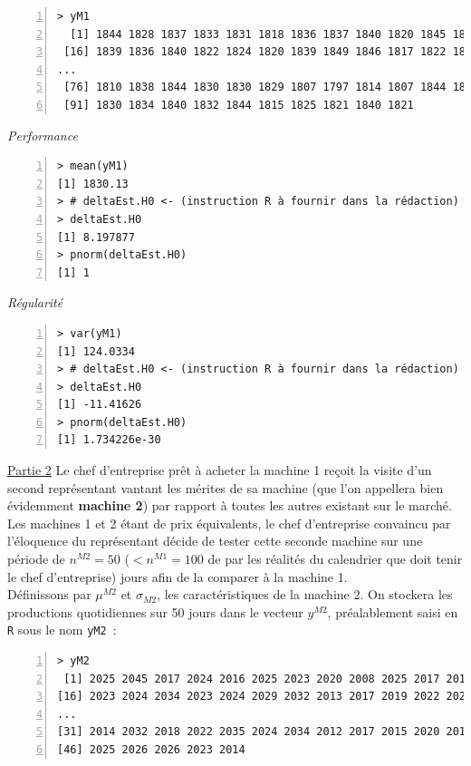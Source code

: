 \documentclass[10pt]{report}
\begin{document}
\begin{exercice}
\IndicR
\begin{Verbatim}[frame=leftline,fontfamily=tt,fontshape=n,numbers=left]
> yM1
  [1] 1844 1828 1837 1833 1831 1818 1836 1837 1840 1820 1845 1815 1831 1839 1824
 [16] 1839 1836 1840 1822 1824 1820 1839 1849 1846 1817 1822 1832 1846 1832 1834
...
 [76] 1810 1838 1844 1830 1830 1829 1807 1797 1814 1807 1844 1834 1827 1841 1830
 [91] 1830 1834 1840 1832 1844 1815 1825 1821 1840 1821
\end{Verbatim}

\noindent \textit{Performance}
\begin{Verbatim}[frame=leftline,fontfamily=tt,fontshape=n,numbers=left]
> mean(yM1)
[1] 1830.13
> # deltaEst.H0 <- (instruction R à fournir dans la rédaction)
> deltaEst.H0
[1] 8.197877
> pnorm(deltaEst.H0)
[1] 1
\end{Verbatim}

\noindent \textit{Régularité}
\begin{Verbatim}[frame=leftline,fontfamily=tt,fontshape=n,numbers=left]
> var(yM1)
[1] 124.0334
> # deltaEst.H0 <- (instruction R à fournir dans la rédaction)
> deltaEst.H0
[1] -11.41626
> pnorm(deltaEst.H0)
[1] 1.734226e-30
\end{Verbatim}

 


\noindent \underline{Partie 2} Le chef d'entreprise pr{\^e}t {\`a} acheter la machine 1 re{\c c}oit la visite d'un second repr{\'e}sentant vantant les m{\'e}rites de sa machine (que l'on appellera bien {\'e}videmment \textbf{machine 2}) par rapport {\`a} toutes les autres existant sur le march{\'e}. Les machines 1 et 2 {\'e}tant de prix {\'e}quivalents, le chef d'entreprise convaincu par l'{\'e}loquence du repr{\'e}sentant d{\'e}cide de tester cette seconde machine sur une p{\'e}riode de $n^{M2}=50$ ($<n^{M1}=100$ de par les r{\'e}alit{\'e}s du calendrier que doit tenir le chef d'entreprise) jours afin de la comparer {\`a} la machine 1. \\
D{\'e}finissons par $\mu^{M2}$ et $\sigma_{M2}$, les caract{\'e}ristiques de la machine 2. On stockera les productions quotidiennes sur 50 jours dans le vecteur $y^{M2}$, pr{\'e}alablement saisi en \texttt{R} sous le nom \texttt{yM2}~:
\begin{Verbatim}[frame=leftline,fontfamily=tt,fontshape=n,numbers=left]
> yM2
 [1] 2025 2045 2017 2024 2016 2025 2023 2020 2008 2025 2017 2014 2024 2028 2009
[16] 2023 2024 2034 2023 2024 2029 2032 2013 2017 2019 2022 2023 2005 2031 2012
...
[31] 2014 2032 2018 2022 2035 2024 2034 2012 2017 2015 2020 2015 2018 2020 2033
[46] 2025 2026 2026 2023 2014
\end{Verbatim}



\end{exercice}
\end{document}
